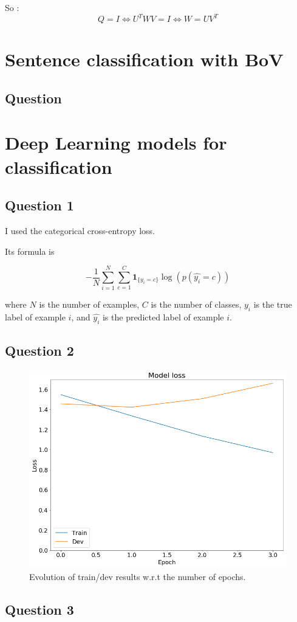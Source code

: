 \documentclass[11pt]{enpc-article}
\begin{document}
So :
$$
  Q = I \Leftrightarrow U^T W V = I \Leftrightarrow W = U V^T
$$

\section{Sentence classification with BoV}

\subsection*{Question}

\section{Deep Learning models for classification}

\subsection*{Question 1}

I used the categorical cross-entropy loss.

Its formula is

$$
  - \frac{1}{N} \sum_{i = 1}^N \sum_{c = 1}^C \mathbf{1}_{\{y_i = c \}} \log(p(\hat{y_i} = c))
$$

where $N$ is the number of examples, $C$ is the number of classes, $y_i$ is the true label of example $i$, and $\hat{y_i}$ is the predicted label of example $i$.

\subsection*{Question 2}

\begin{figure}[H]
  \centering
  \includegraphics[width=\textwidth]{learning_curve.png}
  \caption{Evolution of train/dev results w.r.t the number of epochs.}
\end{figure}

\subsection*{Question 3}
\end{document}
